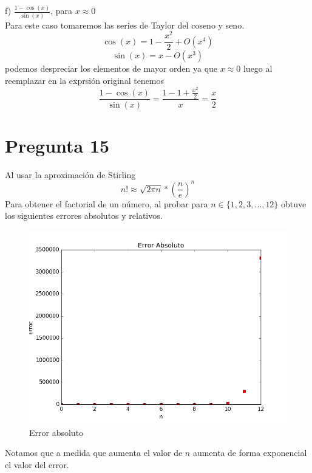 \documentclass{article}
\begin{document}
f) $\frac{1-\cos(x)}{\sin(x)}$, para $x\approx 0$\\

Para este caso tomaremos las series de Taylor del coseno y seno.
$$\cos(x) = 1- \frac{x^{2}}{2}+O(x^{4}) $$
$$\sin(x) = x -O(x^{3})$$
podemos despreciar los elementos de mayor orden ya que $x\approx 0$ luego al reemplazar en la exprsión original tenemos
$$\frac{1-\cos(x)}{\sin(x)}=\frac{1-1+\frac{x^{2}}{2}}{x}=\frac{x}{2}$$
\section*{Pregunta 15}
Al usar la aproximación de Stirling
$$n! \approx \sqrt{2\pi n} * \left(\frac{n}{e}\right)^{n}$$
Para obtener el factorial de un número, al probar para $n \in \{1,2,3,\dots,12\}$ obtuve los siguientes errores absolutos y relativos.\\

\begin{figure}[h!]
\centering
\includegraphics[scale=0.5]{Error_absoluto.png}
\caption{Error absoluto}
\end{figure}
Notamos que a medida que aumenta el valor de $n$ aumenta de forma exponencial el valor del error.\\
\\
\end{document}
